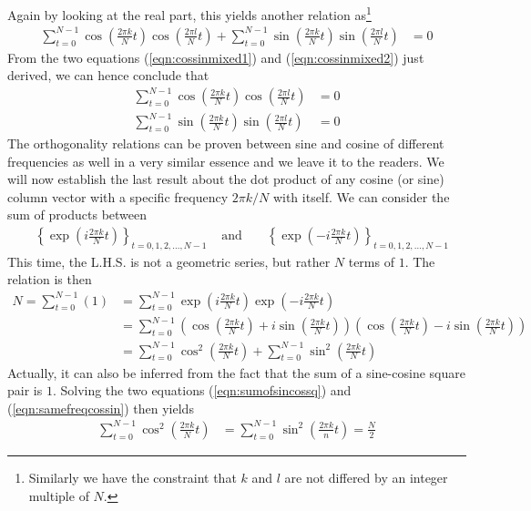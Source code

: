 Again by looking at the real part, this yields another relation as\footnote{Similarly we have the constraint that $k$ and $l$ are not differed by an integer multiple of $N$.}
\begin{align}
\sum_{t=0}^{N-1} \cos(\frac{2\pi k}{N} t)\cos(\frac{2\pi l}{N} t) + \sum_{t=0}^{N-1} \sin(\frac{2\pi k}{N} t)\sin(\frac{2\pi l}{N} t) &= 0 \label{eqn:cossinmixed2}
\end{align}
From the two equations (\ref{eqn:cossinmixed1}) and (\ref{eqn:cossinmixed2}) just derived, we can hence conclude that
\begin{subequations}
\begin{align}
\sum_{t=0}^{N-1} \cos(\frac{2\pi k}{N} t)\cos(\frac{2\pi l}{N} t) &= 0 \\
\sum_{t=0}^{N-1} \sin(\frac{2\pi k}{N} t)\sin(\frac{2\pi l}{N} t) &= 0        
\end{align}    
\end{subequations}
The orthogonality relations can be proven between sine and cosine of different frequencies as well in a very similar essence and we leave it to the readers. We will now establish the last result about the dot product of any cosine (or sine) column vector with a specific frequency $2\pi k/N$ with itself. We can consider the sum of products between
\begin{align*}
&\left\{\exp(i\frac{2\pi k}{N} t)\right\}_{t = 0,1,2,\ldots,N-1} & \text{ and } & &\left\{\exp(-i \frac{2\pi k}{N} t)\right\}_{t = 0,1,2,\ldots,N-1}
\end{align*} 
This time, the L.H.S. is not a geometric series, but rather $N$ terms of $1$. The relation is then
\begin{align}
N = \sum_{t=0}^{N-1} (1) &= \sum_{t=0}^{N-1} \exp(i \frac{2\pi k}{N} t)\exp(-i \frac{2\pi k}{N} t) \nonumber \\
&= \sum_{t=0}^{N-1} \left(\cos(\frac{2\pi k}{N} t) + i\sin(\frac{2\pi k}{N} t)\right)\left(\cos(\frac{2\pi k}{N} t) - i\sin(\frac{2\pi k}{N} t)\right) \nonumber \\
&= \sum_{t=0}^{N-1} \cos^2(\frac{2\pi k}{N} t) + \sum_{t=0}^{N-1} \sin^2(\frac{2\pi k}{N} t) \label{eqn:samefreqcossin}
\end{align}
Actually, it can also be inferred from the fact that the sum of a sine-cosine square pair is $1$. Solving the two equations (\ref{eqn:sumofsincossq}) and (\ref{eqn:samefreqcossin}) then yields
\begin{align}
\sum_{t=0}^{N-1} \cos^2(\frac{2\pi k}{N} t) &= \sum_{t=0}^{N-1} \sin^2(\frac{2\pi k}{n} t) = \frac{N}{2} \label{eqn:sqcossineNhalf}   
\end{align}
